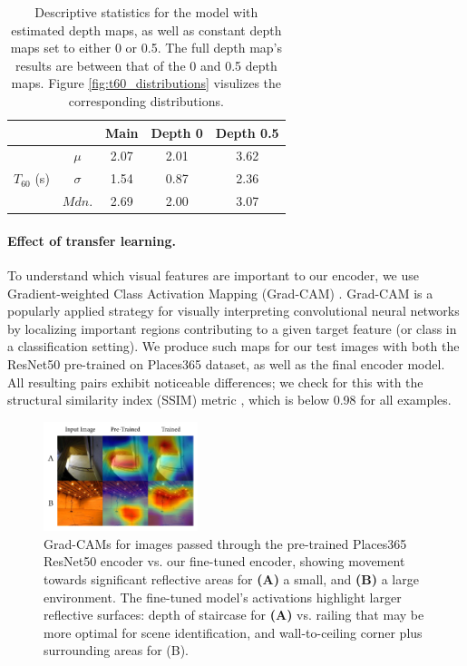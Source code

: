 \documentclass[10pt,twocolumn,letterpaper]{article}
\begin{document}
\begin{table}
    \small
    \centering
    \begin{tabular}{ccccc}
        & & Main & Depth 0 & Depth 0.5\\
        \hline
        \multirow{4}{*}{$T_{60}$ (s)}
        & $\mu$ & 2.07 & 2.01 & 3.62\\
        & $\sigma$ & 1.54 & 0.87 & 2.36\\
        & $Mdn.$ & 2.69 & 2.00 & 3.07\\
    \end{tabular}
    \caption{Descriptive statistics for the model with estimated depth maps, as well as constant depth maps set to either 0 or 0.5. The full depth map's results are between that of the 0 and 0.5 depth maps. Figure \ref{fig:t60_distributions} visulizes the corresponding distributions.}
    \label{tab:t60_distributions}
\end{table}

\paragraph{Effect of transfer learning.}
To understand which visual features are important to our encoder, we use Gradient-weighted Class Activation Mapping (Grad-CAM) \cite{selvaraju2017grad}. Grad-CAM is a popularly applied strategy for visually interpreting convolutional neural networks by localizing important regions contributing to a given target feature (or class in a classification setting). We produce such maps for our test images with both the ResNet50 pre-trained on Places365 dataset, as well as the final encoder model. All resulting pairs exhibit noticeable differences; we check for this with the structural similarity index (SSIM) metric \cite{wang2004image}, which is below 0.98 for all examples.

\begin{figure}[ht]
    \centering
    \includegraphics[width=0.4\textwidth]{gradcam_reflective.png}
    \caption{Grad-CAMs for images passed through the pre-trained Places365 ResNet50 encoder vs. our fine-tuned encoder, showing movement towards significant reflective areas for \textbf{(A)} a small, and \textbf{(B)} a large environment. The fine-tuned model's activations highlight larger reflective surfaces: depth of staircase for \textbf{(A)} vs. railing that may be more optimal for scene identification, and wall-to-ceiling corner plus surrounding areas for (B).}
    \label{fig:gradcam_reflective}
\end{figure}
\end{document}
